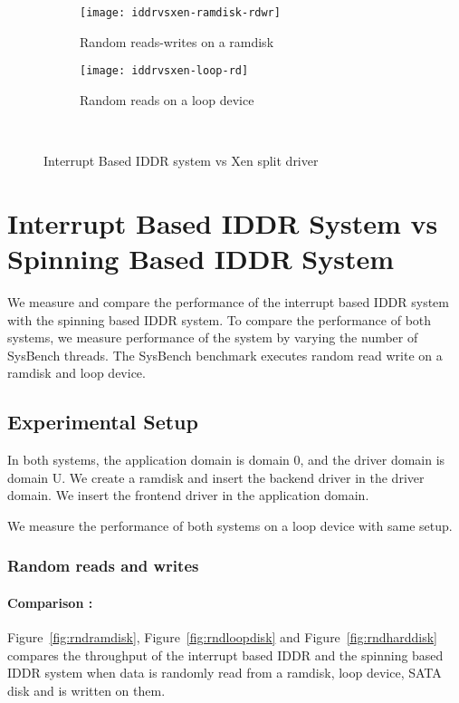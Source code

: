 \begin{figure}[!ht]
  \begin{subfigure}[b]{0.2\textwidth}
  \texttt{[image: iddrvsxen-ramdisk-rdwr]}
  \caption{Random reads-writes on a ramdisk}
  \label{fig:iddrvsxen-ramdisk-rdwr}
  \end{subfigure}
  \hspace{50mm}
  \begin{subfigure}[b]{0.2\textwidth}
  \texttt{[image: iddrvsxen-loop-rd]}
  \caption{Random reads on a loop device}
  \label{fig:iddrvsxen-loop-rd}
  \end{subfigure}\\
\caption{Interrupt Based IDDR system vs Xen split driver}\label{fig:seqloopdisk}
\end{figure}

\section{Interrupt Based IDDR System vs Spinning Based IDDR System}
We measure and compare the performance of the interrupt based IDDR system with the spinning based IDDR system. To compare the performance of both systems, we measure performance of the system by varying the number of SysBench threads. The SysBench benchmark executes random read write on a ramdisk and loop device. 
\subsection*{Experimental Setup}
In both systems, the application domain is domain 0, and the driver domain is domain U. We create a ramdisk and insert the backend driver in the driver domain. We insert the frontend driver in the application domain. 

We measure the performance of both systems on a loop device with same setup.

\subsubsection*{Random reads and writes}

\paragraph{Comparison :}

Figure~\ref{fig:rndramdisk}, Figure~\ref{fig:rndloopdisk} and Figure~\ref{fig:rndharddisk} compares the throughput of the interrupt based IDDR and the spinning based IDDR system when data is randomly read from a ramdisk, loop device, SATA disk and is written on them.

